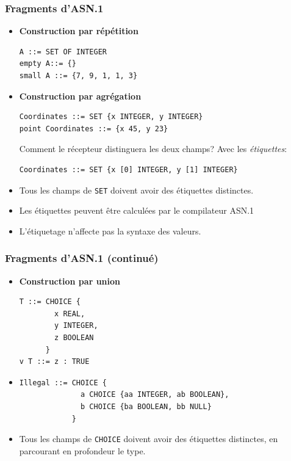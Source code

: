 \documentclass[compress,dvips,xcolor={dvipsnames},t]{beamer}
\begin{document}
\begin{frame}[fragile]
\frametitle{Fragments d'ASN.1}

\begin{itemize}

  \item {\bf Construction par répétition}

\begin{verbatim}
A ::= SET OF INTEGER
empty A::= {}
small A ::= {7, 9, 1, 1, 3}
\end{verbatim}

  \item {\bf Construction par agrégation}

\begin{verbatim}
Coordinates ::= SET {x INTEGER, y INTEGER}
point Coordinates ::= {x 45, y 23}
\end{verbatim}

Comment le récepteur distinguera les deux champs? Avec les {\em
étiquettes}:

\begin{verbatim}
Coordinates ::= SET {x [0] INTEGER, y [1] INTEGER}
\end{verbatim}

  \item Tous les champs de {\tt SET} doivent avoir des étiquettes
        distinctes.

  \item Les étiquettes peuvent être calculées par le compilateur
        \mbox{ASN.1}

  \item L'étiquetage n'affecte pas la syntaxe des valeurs.

\end{itemize}

\end{frame}

\begin{frame}[fragile]
\frametitle{Fragments d'ASN.1 (continué)}

\begin{itemize}

  \item {\bf Construction par union} \\

\begin{verbatim}
T ::= CHOICE {
        x REAL,
        y INTEGER,
        z BOOLEAN
      }
v T ::= z : TRUE
\end{verbatim}

  \item
\begin{verbatim}
Illegal ::= CHOICE {
              a CHOICE {aa INTEGER, ab BOOLEAN},
              b CHOICE {ba BOOLEAN, bb NULL}
            }
\end{verbatim}

  \item Tous les champs de {\tt CHOICE} doivent avoir des étiquettes
        distinctes, en parcourant en profondeur le type.
\end{itemize}

\end{frame}
\end{document}
